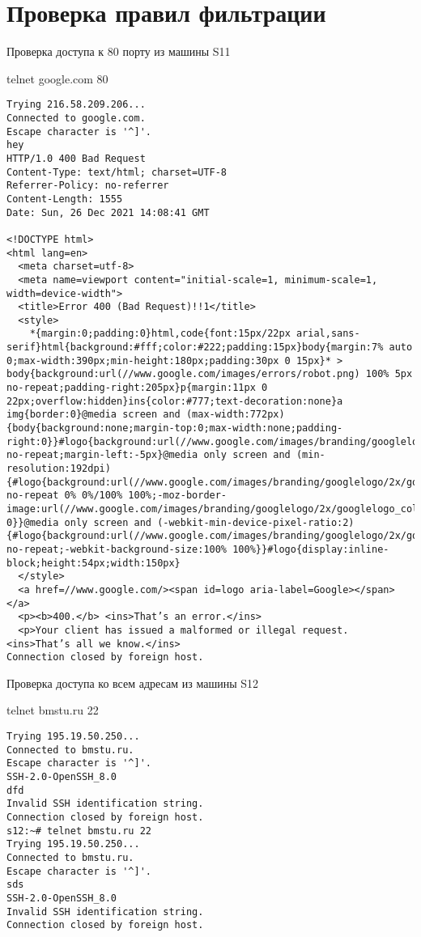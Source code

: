 \documentclass[a4paper,12pt]{article}
\begin{document}
\section{Проверка правил фильтрации}
Проверка доступа к 80 порту из машины S11

telnet google.com 80
\begin{Verbatim}
Trying 216.58.209.206...
Connected to google.com.
Escape character is '^]'.
hey
HTTP/1.0 400 Bad Request
Content-Type: text/html; charset=UTF-8
Referrer-Policy: no-referrer
Content-Length: 1555
Date: Sun, 26 Dec 2021 14:08:41 GMT

<!DOCTYPE html>
<html lang=en>
  <meta charset=utf-8>
  <meta name=viewport content="initial-scale=1, minimum-scale=1, width=device-width">
  <title>Error 400 (Bad Request)!!1</title>
  <style>
    *{margin:0;padding:0}html,code{font:15px/22px arial,sans-serif}html{background:#fff;color:#222;padding:15px}body{margin:7% auto 0;max-width:390px;min-height:180px;padding:30px 0 15px}* > body{background:url(//www.google.com/images/errors/robot.png) 100% 5px no-repeat;padding-right:205px}p{margin:11px 0 22px;overflow:hidden}ins{color:#777;text-decoration:none}a img{border:0}@media screen and (max-width:772px){body{background:none;margin-top:0;max-width:none;padding-right:0}}#logo{background:url(//www.google.com/images/branding/googlelogo/1x/googlelogo_color_150x54dp.png) no-repeat;margin-left:-5px}@media only screen and (min-resolution:192dpi){#logo{background:url(//www.google.com/images/branding/googlelogo/2x/googlelogo_color_150x54dp.png) no-repeat 0% 0%/100% 100%;-moz-border-image:url(//www.google.com/images/branding/googlelogo/2x/googlelogo_color_150x54dp.png) 0}}@media only screen and (-webkit-min-device-pixel-ratio:2){#logo{background:url(//www.google.com/images/branding/googlelogo/2x/googlelogo_color_150x54dp.png) no-repeat;-webkit-background-size:100% 100%}}#logo{display:inline-block;height:54px;width:150px}
  </style>
  <a href=//www.google.com/><span id=logo aria-label=Google></span></a>
  <p><b>400.</b> <ins>That’s an error.</ins>
  <p>Your client has issued a malformed or illegal request.  <ins>That’s all we know.</ins>
Connection closed by foreign host.
\end{Verbatim}


Проверка доступа ко всем адресам из машины S12

telnet bmstu.ru 22
\begin{Verbatim}
Trying 195.19.50.250...
Connected to bmstu.ru.
Escape character is '^]'.
SSH-2.0-OpenSSH_8.0
dfd
Invalid SSH identification string.
Connection closed by foreign host.
s12:~# telnet bmstu.ru 22
Trying 195.19.50.250...
Connected to bmstu.ru.
Escape character is '^]'.
sds
SSH-2.0-OpenSSH_8.0
Invalid SSH identification string.
Connection closed by foreign host.
\end{Verbatim}
\end{document}

